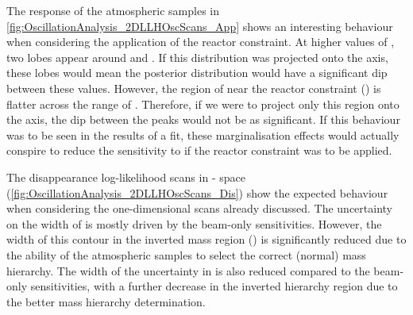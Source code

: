 The response of the atmospheric samples in \autoref{fig:OscillationAnalysis_2DLLHOscScans_App} shows an interesting behaviour when considering the application of the reactor constraint. At higher values of , two lobes appear around  and . If this distribution was projected onto the  axis, these lobes would mean the posterior distribution would have a significant dip between these values. However, the region of  near the reactor constraint () is flatter across the range of . Therefore, if we were to project only this region onto the  axis, the dip between the peaks would not be as significant. If this behaviour was to be seen in the results of a fit, these marginalisation effects would actually conspire to reduce the sensitivity to  if the reactor constraint was to be applied.

The disappearance log-likelihood scans in - space (\autoref{fig:OscillationAnalysis_2DLLHOscScans_Dis}) show the expected behaviour when considering the one-dimensional scans already discussed. The uncertainty on the width of  is mostly driven by the beam-only sensitivities. However, the width of this contour in the inverted mass region () is significantly reduced due to the ability of the atmospheric samples to select the correct (normal) mass hierarchy. The width of the uncertainty in  is also reduced compared to the beam-only sensitivities, with a further decrease in the inverted hierarchy region due to the better mass hierarchy determination.

